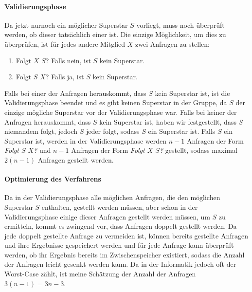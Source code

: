 \documentclass[a4paper,10pt,ngerman]{scrartcl}
\begin{document}
\paragraph{Validierungsphase}
Da jetzt nurnoch ein möglicher Superstar $S$ vorliegt, muss noch überprüft werden, ob dieser tatsächlich
einer ist. Die einzige Möglichkeit, um dies zu überprüfen, ist für jedes andere Mitglied $X$ zwei Anfragen
zu stellen:
\begin{enumerate}
\item Folgt $X$ $S$? Falls nein, ist $S$ kein Superstar.
\item Folgt $S$ $X$? Falls ja, ist $S$ kein Superstar.
\end{enumerate}
Falls bei einer der Anfragen herauskommt, dass $S$ kein Superstar ist, ist die Validierungsphase
beendet und es gibt keinen Superstar in der Gruppe, da $S$ der einzige mögliche Superstar
vor der Validierungsphase war.\newline
Falls bei keiner der Anfragen herauskommt, dass $S$ kein Superstar ist, haben wir festgestellt,
dass $S$ niemandem folgt, jedoch $S$ jeder folgt, sodass $S$ ein Superstar ist.\newline
Falls $S$ ein Superstar ist, werden in der Validierungsphase werden $n-1$ Anfragen der Form 
\textit{Folgt $S$ $X$?} und $n-1$ Anfragen der Form \textit{Folgt $X$ $S$?} gestellt, sodass maximal $2(n-1)$
Anfragen gestellt werden.

\paragraph{Optimierung des Verfahrens}
Da in der Validierungsphase alle möglichen Anfragen, die den möglichen Superstar $S$
enthalten, gestellt werden müssen, aber schon in der Validierungsphase einige dieser Anfragen
gestellt werden müssen, um $S$ zu ermitteln, kommt es zwingend vor, dass Anfragen doppelt
gestellt werden. Da jede doppelt gestellte Anfrage zu vermeiden ist, können bereits gestellte 
Anfragen und ihre Ergebnisse gespeichert werden und für jede Anfrage kann überprüft werden,
ob ihr Ergebnis bereits im Zwischenspeicher existiert, sodass die Anzahl der Anfragen leicht gesenkt
werden kann. Da in der Informatik jedoch oft der Worst-Case zählt, ist meine Schätzung der Anzahl der Anfragen $3(n-1) = 3n-3$.

\clearpage
\end{document}
